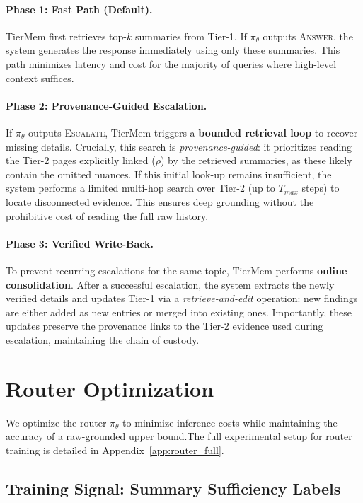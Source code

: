 \documentclass{article}
\theoremstyle{plain}
\theoremstyle{definition}
\theoremstyle{remark}
\begin{document}
\paragraph{Phase 1: Fast Path (Default).}
TierMem first retrieves top-$k$ summaries from Tier-1.
If $\pi_\theta$ outputs \textsc{Answer}, the system generates the response immediately using only these summaries.
This path minimizes latency and cost for the majority of queries where high-level context suffices.

\paragraph{Phase 2: Provenance-Guided Escalation.}
If $\pi_\theta$ outputs \textsc{Escalate}, TierMem triggers a \textbf{bounded retrieval loop} to recover missing details.
Crucially, this search is \emph{provenance-guided}: it prioritizes reading the Tier-2 pages explicitly linked ($\rho$) by the retrieved summaries, as these likely contain the omitted nuances.
If this initial look-up remains insufficient, the system performs a limited multi-hop search over Tier-2 (up to $T_{max}$ steps) to locate disconnected evidence.
This ensures deep grounding without the prohibitive cost of reading the full raw history.

\paragraph{Phase 3: Verified Write-Back.}
To prevent recurring escalations for the same topic, TierMem performs \textbf{online consolidation}.
After a successful escalation, the system extracts the newly verified details and updates Tier-1 via a \emph{retrieve-and-edit} operation: new findings are either added as new entries or merged into existing ones.
Importantly, these updates preserve the provenance links to the Tier-2 evidence used during escalation, maintaining the chain of custody.

\section{Router Optimization}
\label{sec:optimization}

We optimize the router $\pi_\theta$ to minimize inference costs while maintaining the accuracy of a raw-grounded upper bound.The full experimental setup for router training is detailed in Appendix~\ref{app:router_full}.

\subsection{Training Signal: Summary Sufficiency Labels}
\label{sec:opt_labels}
\end{document}
